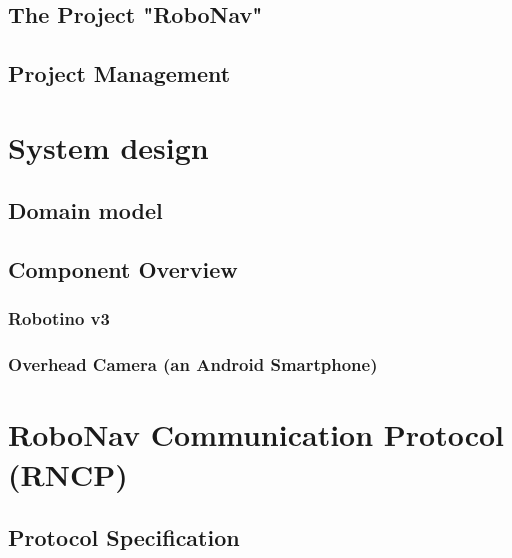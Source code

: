 \documentclass[12pt]{article}
\begin{document}
\subsection{The Project "RoboNav"}
\label{subsec:project}
%

\subsection{Project Management}
\label{subsec:pm}
%

\newpage %

\section{System design}
\label{sec:systemdesign}
%

\subsection{Domain model}
\label{subsec:domainmodel}
%

\newpage
\subsection{Component Overview}
\label{subsec:components}
%

\subsubsection{Robotino v3}
\label{subsubsec:robotinov3}
%

\subsubsection{Overhead Camera (an Android Smartphone)}
\label{subsubsec:ipwebcam}
%

\newpage %
\section{RoboNav Communication Protocol (RNCP)}
\label{sec:rncp}
%
\newpage

\subsection{Protocol Specification}
\label{subsec:protocolspec}
%
\end{document}
